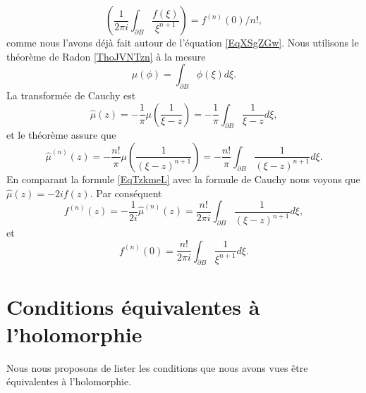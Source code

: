     \begin{equation}
        \left( \frac{1}{ 2\pi i }\int_{\partial B}\frac{ f(\xi) }{ \xi^{n+1} } \right)=f^{(n)}(0)/n!,
    \end{equation}
    comme nous l'avons déjà fait autour de l'équation \eqref{EqXSgZGw}. Nous utilisons le théorème de Radon \ref{ThoJVNTzn} à la mesure
    \begin{equation}
        \mu(\phi)=\int_{\partial B}\phi(\xi)d\xi.
    \end{equation}
    La transformée de Cauchy est
    \begin{equation}        \label{EqTzkmeL}
        \hat \mu(z)=-\frac{1}{ \pi }\mu\left( \frac{1}{ \xi-z } \right)=-\frac{1}{ \pi }\int_{\partial B}\frac{1}{ \xi-z }d\xi,
    \end{equation}
    et le théorème assure que
    \begin{equation}
        \hat\mu^{(n)}(z)=-\frac{ n! }{ \pi }\mu\left( \frac{1}{ (\xi-z)^{n+1} } \right)=-\frac{ n! }{ \pi }\int_{\partial B}\frac{ 1 }{ (\xi-z)^{n+1} }d\xi.
    \end{equation}
    En comparant la formule \eqref{EqTzkmeL} avec la formule de Cauchy nous voyons que \( \hat\mu(z)=-2i f(z)\). Par conséquent
    \begin{equation}
        f^{(n)}(z)=-\frac{1}{ 2i }\hat\mu^{(n)}(z)=\frac{ n! }{ 2\pi i }\int_{\partial B}\frac{1}{ (\xi-z)^{n+1} }d\xi,
    \end{equation}
    et
    \begin{equation}
        f^{(n)}(0)=\frac{ n! }{ 2\pi i }\int_{\partial B}\frac{1}{ \xi^{n+1} }d\xi.
    \end{equation}

\section{Conditions équivalentes à l'holomorphie}

Nous nous proposons de lister les conditions que nous avons vues être équivalentes à l'holomorphie.

